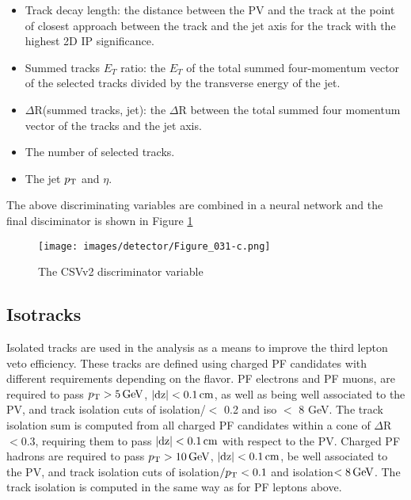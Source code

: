 \begin{itemize}
\item Track decay length: the distance between the PV and the track at the point of closest approach between the track and the jet axis for the track with the highest 2D IP significance.
\item Summed tracks $E_T$ ratio: the $E_T$ of the total summed four-momentum vector of the selected tracks divided by the transverse energy of the jet.
\item $\Delta$R(summed tracks, jet): the $\Delta$R between the total summed four momentum vector of the tracks and the jet axis.
\item The number of selected tracks.
\item The jet $p_{\mathrm{T}}$ and $\eta$.
\end{itemize}
The above discriminating variables are combined in a neural network and the final disciminator is shown in Figure \ref{fig:CSVv2}
\begin{figure}[!h]
\centering
\texttt{[image: images/detector/Figure\_031-c.png]}\\
\caption{The CSVv2 discriminator variable\cite{Sirunyan:2017ezt}}
\label{fig:CSVv2}
\end{figure}
\subsection{Isotracks}
Isolated tracks are used in the analysis as a means to improve the third lepton veto efficiency. 
These tracks are defined using charged PF candidates with different requirements depending on the flavor. 
PF electrons and PF muons, are required to pass $p_{\mathrm{T}}>5\,\text{Ge\hspace{-.08em}V}$, $|\mathrm{dz}|<0.1\,\text{cm}$, as well as being well associated to the PV, and track isolation cuts of isolation/\pt $<$ 0.2 and iso $<$ 8 GeV. 
The track isolation sum is computed from all charged PF candidates within a cone of $\Delta$R$<0.3$, requiring them to pass $|\mathrm{dz}|<0.1\,\text{cm}$ with respect to the PV. 
Charged PF hadrons are required to pass $p_{\mathrm{T}}>10\,\text{Ge\hspace{-.08em}V}$, $|\mathrm{dz}|<0.1\,\text{cm}$, be well associated to the PV, and track isolation cuts of isolation$/p_{\mathrm{T}}<0.1$ and isolation$<8\,\text{Ge\hspace{-.08em}V}$. 
The track isolation is computed in the same way as for PF leptons above.


